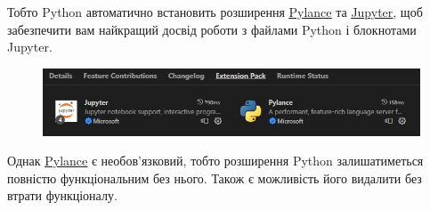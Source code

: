 \documentclass[a4paper,12pt]{article}
\begin{document}
    Тобто Python автоматично встановить розширення \href{https://marketplace.visualstudio.com/items?itemName=ms-python.vscode-pylance}{\underline{Pylance}}
    та \href{https://marketplace.visualstudio.com/items?itemName=ms-toolsai.jupyter}{\underline{Jupyter}}, щоб забезпечити вам найкращий досвід роботи з файлами Python 
    і блокнотами Jupyter. 
    \begin{figure}[h!]
        \begin{center}
            \includegraphics[scale=0.7]{Prt sc/Figure_9.jpg}
        \end{center}
    \end{figure}

    Однак \href{https://marketplace.visualstudio.com/items?itemName=ms-python.vscode-pylance}{\underline{Pylance}} є необов'язковий, 
    тобто розширення Python залишатиметься повністю функціональним без нього. Також є можливість його видалити без втрати функціоналу.
\end{document}
